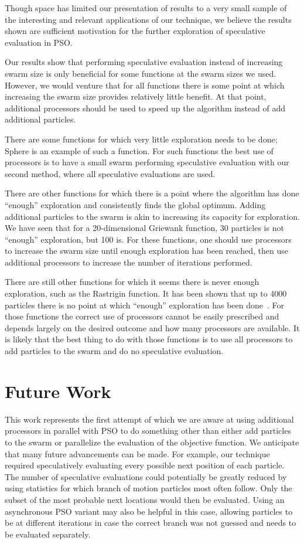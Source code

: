 \documentclass[oneside,honors]{honors}
\begin{document}
Though space has limited our presentation of results to a very small sample of
the interesting and relevant applications of our technique, we believe the
results shown are sufficient motivation for the further exploration of
speculative evaluation in PSO.

Our results show that performing speculative evaluation instead of increasing
swarm size is only beneficial for some functions at the swarm sizes we used.
However, we would venture that for all functions there is some point at which
increasing the swarm size provides relatively little benefit.  At that point,
additional processors should be used to speed up the algorithm instead of add
additional particles.

There are some functions for which very little exploration needs to be done;
Sphere is an example of such a function.  For such functions the best use of
processors is to have a small swarm performing speculative evaluation with our
second method, where all speculative evaluations are used.

There are other functions for which there is a point where the algorithm has
done ``enough'' exploration and consistently finds the global optimum.  Adding
additional particles to the swarm is akin to increasing its capacity for
exploration.  We have seen that for a 20-dimensional Griewank function, 30
particles is not ``enough'' exploration, but 100 is.  For these functions, one
should use processors to increase the swarm size until enough exploration has
been reached, then use additional processors to increase the number of
iterations performed.

There are still other functions for which it seems there is never enough
exploration, such as the Rastrigin function.  It has been shown that up to 4000
particles there is no point at which ``enough'' exploration has been
done~\cite{mcnabb-cec09}.  For those functions the correct use of processors
cannot be easily prescribed and depends largely on the desired outcome and how
many processors are available.  It is likely that the best thing to do with
those functions is to use all processors to add particles to the swarm and do
no speculative evaluation.

\section{Future Work}
\label{sec:future}

This work represents the first attempt of which we are aware at using
additional processors in parallel with PSO to do something other than either
add particles to the swarm or parallelize the evaluation of the objective
function.  We anticipate that many future advancements can be made.  For
example, our technique required speculatively evaluating every possible next
position of each particle.  The number of speculative evaluations could
potentially be greatly reduced by using statistics for which branch of motion
particles most often follow.  Only the subset of the most probable next
locations would then be evaluated.  Using an asynchronous PSO variant may also
be helpful in this case, allowing particles to be at different iterations in
case the correct branch was not guessed and needs to be evaluated separately.
\end{document}
